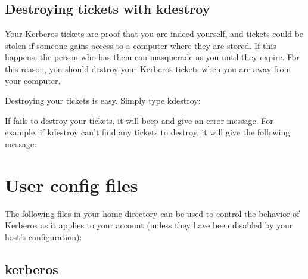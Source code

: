 \documentclass[letterpaper,10pt,english]{sphinxmanual}
\begin{document}
\section{Destroying tickets with kdestroy}
\label{\detokenize{user/tkt_mgmt:destroying-tickets-with-kdestroy}}
\sphinxAtStartPar
Your Kerberos tickets are proof that you are indeed yourself, and
tickets could be stolen if someone gains access to a computer where
they are stored.  If this happens, the person who has them can
masquerade as you until they expire.  For this reason, you should
destroy your Kerberos tickets when you are away from your computer.

\sphinxAtStartPar
Destroying your tickets is easy.  Simply type kdestroy:

\begin{sphinxVerbatim}[commandchars=\\\{\}]
 
\end{sphinxVerbatim}

\sphinxAtStartPar
If {\hyperref[\detokenize{user/user_commands/kdestroy:kdestroy-1}]{}} fails to destroy your tickets, it will beep and
give an error message.  For example, if kdestroy can’t find any
tickets to destroy, it will give the following message:

\begin{sphinxVerbatim}[commandchars=\\\{\}]
 
        
\end{sphinxVerbatim}

\sphinxstepscope


\chapter{User config files}
\label{\detokenize{user/user_config/index:user-config-files}}\label{\detokenize{user/user_config/index::doc}}
\sphinxAtStartPar
The following files in your home directory can be used to control the
behavior of Kerberos as it applies to your account (unless they have
been disabled by your host’s configuration):

\sphinxstepscope


\section{kerberos}
\label{\detokenize{user/user_config/kerberos:kerberos}}\label{\detokenize{user/user_config/kerberos:kerberos-7}}\label{\detokenize{user/user_config/kerberos::doc}}
\end{document}
